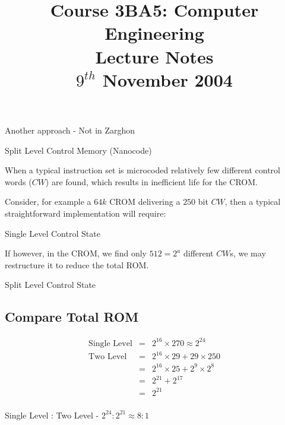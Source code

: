 \documentclass[a4paper,12pt]{article}
\begin{document}
\title{Course 3BA5: Computer Engineering \\ Lecture Notes \\ $9^{th}$ November 2004}

\maketitle

Another approach - Not in Zarghon

Split Level Control Memory (Nanocode)

When a typical instruction set is microcoded relatively few different
control words ($CW$) are found, which results in inefficient life for
the CROM.

Consider, for example a $64k$ CROM delivering a $250$ bit $CW$, then a
typical straightforward implementation will require:

\begin{table}[hbtp]


\caption{Single Level Control State}

\end{table}

If however, in the CROM, we find only $512 = 2^{a}$ different $CW$s, we
may restructure it to reduce the total ROM.


\begin{table}[hbtp]


\caption{Split Level Control State}

\end{table}

\subsection*{Compare Total ROM}

\begin{eqnarray*}
\mbox{Single Level}	&	=	&	2^{16} \times 270 \approx 2^{24} 		\\
\mbox{Two Level}		&	=	&	2^{16} \times 29 + 29 \times 250			\\
							&	=	&	2^{16} \times 25 + 2^{9} \times 2^{8}	\\
							&	=	&	2^{21} + 2^{17}								\\
							&	=	&	2^{21}											\\
\end{eqnarray*}

Single Level : Two Level - $2^{24} : 2^{21} \approx 8 : 1$
\end{document}
